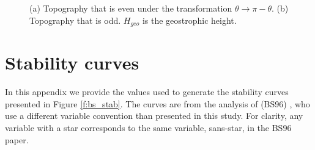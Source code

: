 \begin{figure}
\begin{center}
{
}
%
\end{center}
\caption[Geostrophic height function schematic]{(a) Topography that is even under the transformation $\theta\rightarrow \pi -\theta.$ (b) Topography that is odd.  $H_{geo}$ is the geostrophic height.}
\label{f:sketch}
\end{figure}

\section{Stability curves}
\label{a:bs_stab}
In this appendix we provide the values used to generate the stability curves presented in Figure \ref{f:bs_stab}. The curves are from the analysis of (BS96) \citep{pB96}, who use a different variable convention than presented in this study. For clarity, any variable with a star corresponds to the same variable, sans-star, in the BS96 paper.

